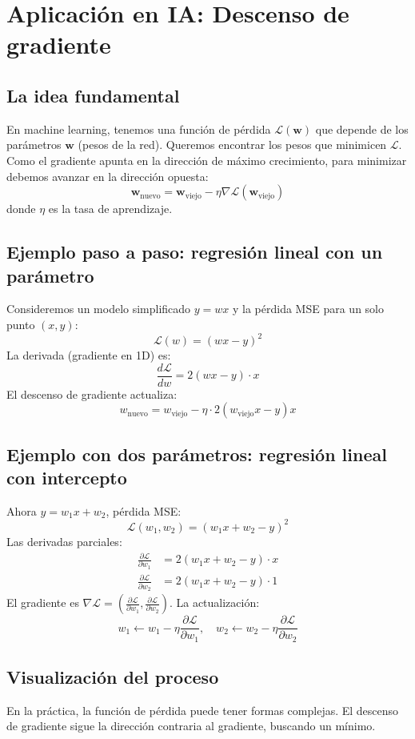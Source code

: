 \documentclass[12pt,a4paper,openany,oneside]{book}
\begin{document}
\section{Aplicación en IA: Descenso de gradiente}

\subsection{La idea fundamental}
En machine learning, tenemos una función de pérdida $\mathcal{L}(\mathbf{w})$ que depende de los parámetros $\mathbf{w}$ (pesos de la red). Queremos encontrar los pesos que minimicen $\mathcal{L}$. Como el gradiente apunta en la dirección de máximo crecimiento, para minimizar debemos avanzar en la dirección opuesta:
\[
\mathbf{w}_{\text{nuevo}} = \mathbf{w}_{\text{viejo}} - \eta \nabla \mathcal{L}(\mathbf{w}_{\text{viejo}})
\]
donde $\eta$ es la tasa de aprendizaje.

\subsection{Ejemplo paso a paso: regresión lineal con un parámetro}
Consideremos un modelo simplificado $y = wx$ y la pérdida MSE para un solo punto $(x, y)$:
\[
\mathcal{L}(w) = (wx - y)^2
\]
La derivada (gradiente en 1D) es:
\[
\frac{d\mathcal{L}}{dw} = 2(wx - y) \cdot x
\]
El descenso de gradiente actualiza:
\[
w_{\text{nuevo}} = w_{\text{viejo}} - \eta \cdot 2(w_{\text{viejo}} x - y) x
\]

\subsection{Ejemplo con dos parámetros: regresión lineal con intercepto}
Ahora $y = w_1 x + w_2$, pérdida MSE:
\[
\mathcal{L}(w_1, w_2) = (w_1 x + w_2 - y)^2
\]
Las derivadas parciales:
\begin{align*}
\frac{\partial \mathcal{L}}{\partial w_1} &= 2(w_1 x + w_2 - y) \cdot x \\
\frac{\partial \mathcal{L}}{\partial w_2} &= 2(w_1 x + w_2 - y) \cdot 1
\end{align*}
El gradiente es $\nabla \mathcal{L} = \left( \frac{\partial \mathcal{L}}{\partial w_1}, \frac{\partial \mathcal{L}}{\partial w_2} \right)$. La actualización:
\[
w_1 \leftarrow w_1 - \eta \frac{\partial \mathcal{L}}{\partial w_1}, \quad w_2 \leftarrow w_2 - \eta \frac{\partial \mathcal{L}}{\partial w_2}
\]

\subsection{Visualización del proceso}
En la práctica, la función de pérdida puede tener formas complejas. El descenso de gradiente sigue la dirección contraria al gradiente, buscando un mínimo.
\end{document}

